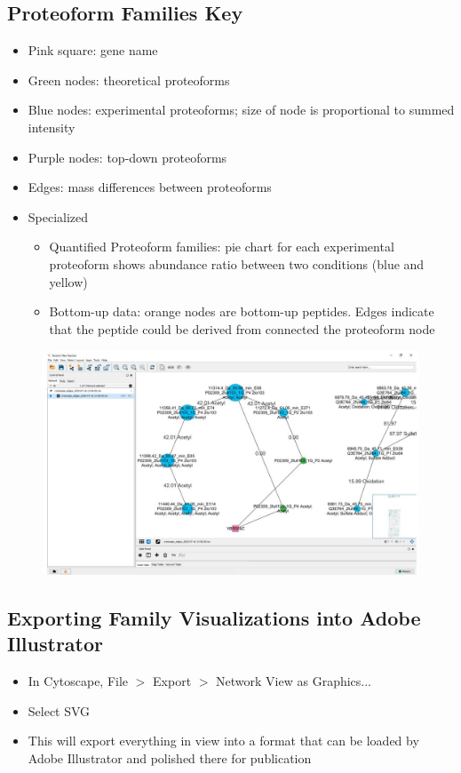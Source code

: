 \subsection{Proteoform Families Key}
\begin{itemize}
	\item Pink square: gene name
	\item Green nodes: theoretical proteoforms
	\item Blue nodes: experimental proteoforms; size of node is proportional to summed intensity
	\item Purple nodes: top-down proteoforms
	\item Edges: mass differences between proteoforms
	\item Specialized
	\begin{itemize}
		\item Quantified Proteoform families: pie chart for each experimental proteoform shows abundance ratio between two conditions (blue and yellow)
		\item Bottom-up data: orange nodes are bottom-up peptides. Edges indicate that the peptide could be derived from connected the proteoform node
	\end{itemize}
\end{itemize}
\begin{figure}[h]
\centering
\includegraphics[scale=0.5]{figures/cytoscape2.jpg}
\end{figure}

\subsection{Exporting Family Visualizations into Adobe Illustrator}
\begin{itemize}
	\item In Cytoscape, File $>$ Export $>$ Network View as Graphics...
	\item Select SVG
	\item This will export everything in view into a format that can be loaded by Adobe Illustrator and polished there for publication
\end{itemize}



